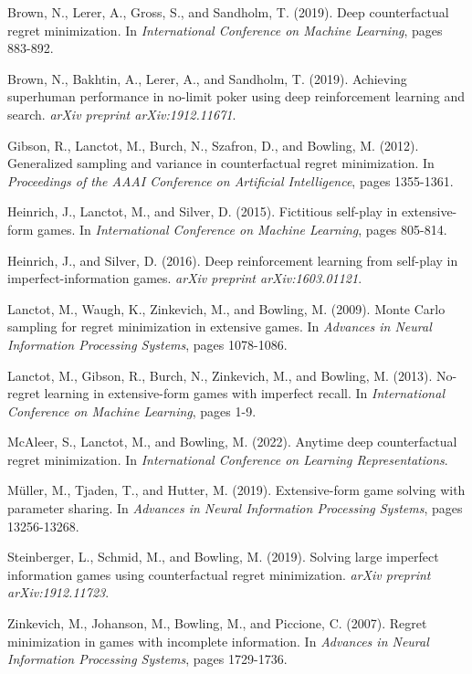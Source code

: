 \documentclass{article}
\begin{document}

\begin{thebibliography}{9}

Brown, N., Lerer, A., Gross, S., and Sandholm, T. (2019).
\newblock Deep counterfactual regret minimization.
\newblock In \emph{International Conference on Machine Learning}, pages 883-892.

Brown, N., Bakhtin, A., Lerer, A., and Sandholm, T. (2019).
\newblock Achieving superhuman performance in no-limit poker using deep reinforcement learning and search.
\newblock \emph{arXiv preprint arXiv:1912.11671}.

Gibson, R., Lanctot, M., Burch, N., Szafron, D., and Bowling, M. (2012).
\newblock Generalized sampling and variance in counterfactual regret minimization.
\newblock In \emph{Proceedings of the AAAI Conference on Artificial Intelligence}, pages 1355-1361.

Heinrich, J., Lanctot, M., and Silver, D. (2015).
\newblock Fictitious self-play in extensive-form games.
\newblock In \emph{International Conference on Machine Learning}, pages 805-814.

Heinrich, J., and Silver, D. (2016).
\newblock Deep reinforcement learning from self-play in imperfect-information games.
\newblock \emph{arXiv preprint arXiv:1603.01121}.

Lanctot, M., Waugh, K., Zinkevich, M., and Bowling, M. (2009).
\newblock Monte Carlo sampling for regret minimization in extensive games.
\newblock In \emph{Advances in Neural Information Processing Systems}, pages 1078-1086.

Lanctot, M., Gibson, R., Burch, N., Zinkevich, M., and Bowling, M. (2013).
\newblock No-regret learning in extensive-form games with imperfect recall.
\newblock In \emph{International Conference on Machine Learning}, pages 1-9.

McAleer, S., Lanctot, M., and Bowling, M. (2022).
\newblock Anytime deep counterfactual regret minimization.
\newblock In \emph{International Conference on Learning Representations}.

Müller, M., Tjaden, T., and Hutter, M. (2019).
\newblock Extensive-form game solving with parameter sharing.
\newblock In \emph{Advances in Neural Information Processing Systems}, pages 13256-13268.

Steinberger, L., Schmid, M., and Bowling, M. (2019).
\newblock Solving large imperfect information games using counterfactual regret minimization.
\newblock \emph{arXiv preprint arXiv:1912.11723}.

Zinkevich, M., Johanson, M., Bowling, M., and Piccione, C. (2007).
\newblock Regret minimization in games with incomplete information.
\newblock In \emph{Advances in Neural Information Processing Systems}, pages 1729-1736.

\end{thebibliography}
\end{document}
